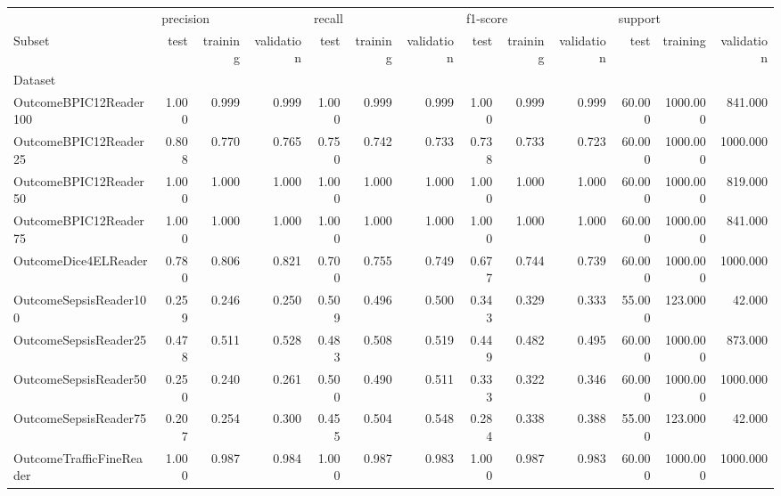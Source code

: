 \begin{tabular}{lrrrrrrrrrrrr}
\toprule
 & \multicolumn{3}{l}{precision} & \multicolumn{3}{l}{recall} & \multicolumn{3}{l}{f1-score} & \multicolumn{3}{l}{support} \\
Subset & test & training & validation & test & training & validation & test & training & validation & test & training & validation \\
Dataset &  &  &  &  &  &  &  &  &  &  &  &  \\
\midrule
OutcomeBPIC12Reader100 & 1.000 & 0.999 & 0.999 & 1.000 & 0.999 & 0.999 & 1.000 & 0.999 & 0.999 & 60.000 & 1000.000 & 841.000 \\
OutcomeBPIC12Reader25 & 0.808 & 0.770 & 0.765 & 0.750 & 0.742 & 0.733 & 0.738 & 0.733 & 0.723 & 60.000 & 1000.000 & 1000.000 \\
OutcomeBPIC12Reader50 & 1.000 & 1.000 & 1.000 & 1.000 & 1.000 & 1.000 & 1.000 & 1.000 & 1.000 & 60.000 & 1000.000 & 819.000 \\
OutcomeBPIC12Reader75 & 1.000 & 1.000 & 1.000 & 1.000 & 1.000 & 1.000 & 1.000 & 1.000 & 1.000 & 60.000 & 1000.000 & 841.000 \\
OutcomeDice4ELReader & 0.780 & 0.806 & 0.821 & 0.700 & 0.755 & 0.749 & 0.677 & 0.744 & 0.739 & 60.000 & 1000.000 & 1000.000 \\
OutcomeSepsisReader100 & 0.259 & 0.246 & 0.250 & 0.509 & 0.496 & 0.500 & 0.343 & 0.329 & 0.333 & 55.000 & 123.000 & 42.000 \\
OutcomeSepsisReader25 & 0.478 & 0.511 & 0.528 & 0.483 & 0.508 & 0.519 & 0.449 & 0.482 & 0.495 & 60.000 & 1000.000 & 873.000 \\
OutcomeSepsisReader50 & 0.250 & 0.240 & 0.261 & 0.500 & 0.490 & 0.511 & 0.333 & 0.322 & 0.346 & 60.000 & 1000.000 & 1000.000 \\
OutcomeSepsisReader75 & 0.207 & 0.254 & 0.300 & 0.455 & 0.504 & 0.548 & 0.284 & 0.338 & 0.388 & 55.000 & 123.000 & 42.000 \\
OutcomeTrafficFineReader & 1.000 & 0.987 & 0.984 & 1.000 & 0.987 & 0.983 & 1.000 & 0.987 & 0.983 & 60.000 & 1000.000 & 1000.000 \\
\bottomrule
\end{tabular}
